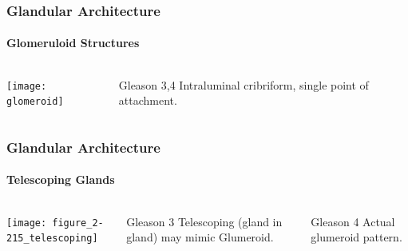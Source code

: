\begin{frame}
\frametitle{Glandular Architecture}
    \framesubtitle{Glomeruloid Structures}

    \begin{columns}
        \centering
        \texttt{[image: glomeroid]}
        \begin{block}{Gleason 3,4}
            Intraluminal cribriform, single point of attachment.
        \end{block}
    \end{columns}

\end{frame}


\begin{frame}
\frametitle{Glandular Architecture}
    \framesubtitle{Telescoping Glands}

    \begin{columns}
        \centering
        \texttt{[image: figure\_2-215\_telescoping]}
        \begin{block}{Gleason 3}
            Telescoping (gland in gland) may mimic Glumeroid. 
        \end{block}
        \begin{block}{Gleason 4}
            Actual glumeroid pattern. 
        \end{block}
    \end{columns}

\end{frame}


